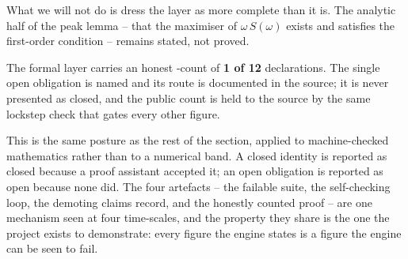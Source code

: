What we will not do is dress the layer as more complete than it is. The analytic
half of the peak lemma -- that the maximiser of $\omega \, S(\omega)$ exists and
satisfies the first-order condition -- remains stated, not proved.

\begin{invariant}
\label{inv:sorry}
The formal layer carries an honest -count of \textbf{1 of 12}
declarations. The single open obligation is named and its route is documented in
the source; it is never presented as closed, and the public count is held to the
source by the same lockstep check that gates every other figure.
\end{invariant}

\noindent This is the same posture as the rest of the section, applied to
machine-checked mathematics rather than to a numerical band. A closed identity is
reported as closed because a proof assistant accepted it; an open obligation is
reported as open because none did. The four artefacts -- the failable suite, the
self-checking loop, the demoting claims record, and the honestly counted proof
-- are one mechanism seen at four time-scales, and the property they share is the
one the project exists to demonstrate: every figure the engine states is a figure
the engine can be seen to fail.
